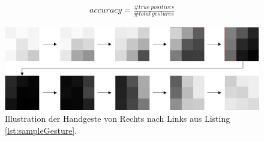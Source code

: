 \begin{align}
    accuracy = \frac{\#true\ positives}{\#total\ gestures}
    \label{klisch_metric}
\end{align}
\begin{figure}[h!]
    \centering
    \includegraphics[width=\linewidth]{images/sample_gesture_total.jpg}
    \caption{Illustration der Handgeste von Rechts nach Links aus Listing \ref{lst:sampleGesture}.}
    \label{fig:sample_gesture}
\end{figure}